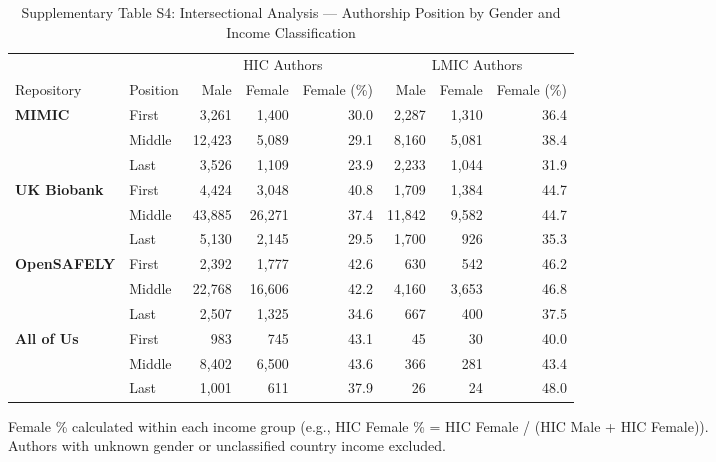 \begin{table}[htbp]
\centering
\caption{Supplementary Table S4: Intersectional Analysis --- Authorship Position by Gender and Income Classification}
\label{tab:intersectional}
\begin{tabular}{llrrrrrr}
\toprule
 & & \multicolumn{3}{c}{HIC Authors} & \multicolumn{3}{c}{LMIC Authors} \\
\cmidrule(lr){3-5} \cmidrule(lr){6-8}
Repository & Position & Male & Female & Female (\%) & Male & Female & Female (\%) \\
\midrule
\textbf{MIMIC} & First  & 3,261  & 1,400 & 30.0 & 2,287 & 1,310 & 36.4 \\
               & Middle & 12,423 & 5,089 & 29.1 & 8,160 & 5,081 & 38.4 \\
               & Last   & 3,526  & 1,109 & 23.9 & 2,233 & 1,044 & 31.9 \\
\addlinespace
\textbf{UK Biobank} & First  & 4,424  & 3,048  & 40.8 & 1,709  & 1,384 & 44.7 \\
                    & Middle & 43,885 & 26,271 & 37.4 & 11,842 & 9,582 & 44.7 \\
                    & Last   & 5,130  & 2,145  & 29.5 & 1,700  & 926   & 35.3 \\
\addlinespace
\textbf{OpenSAFELY} & First  & 2,392  & 1,777  & 42.6 & 630   & 542 & 46.2 \\
                    & Middle & 22,768 & 16,606 & 42.2 & 4,160 & 3,653 & 46.8 \\
                    & Last   & 2,507  & 1,325  & 34.6 & 667   & 400   & 37.5 \\
\addlinespace
\textbf{All of Us}  & First  & 983   & 745   & 43.1 & 45  & 30  & 40.0 \\
                    & Middle & 8,402 & 6,500 & 43.6 & 366 & 281 & 43.4 \\
                    & Last   & 1,001 & 611   & 37.9 & 26  & 24  & 48.0 \\
\bottomrule
\end{tabular}

\smallskip
\footnotesize
Female \% calculated within each income group (e.g., HIC Female \% = HIC Female / (HIC Male + HIC Female)). \\
Authors with unknown gender or unclassified country income excluded.
\end{table}
